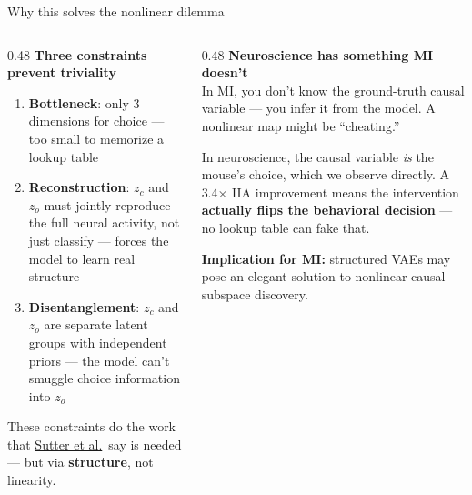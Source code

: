 \documentclass[aspectratio=169,11pt]{beamer}
\begin{document}
\begin{frame}{Why this solves the nonlinear dilemma}
\begin{columns}[T]
\begin{column}{0.48\textwidth}
\textbf{Three constraints prevent triviality}
\begin{enumerate}\setlength\itemsep{4pt}
  \item \textbf{Bottleneck}: only 3 dimensions for choice --- too small to memorize a lookup table
  \item \textbf{Reconstruction}: $z_c$ and $z_o$ must jointly reproduce the full neural activity, not just classify --- forces the model to learn real structure
  \item \textbf{Disentanglement}: $z_c$ and $z_o$ are separate latent groups with independent priors --- the model can't smuggle choice information into $z_o$
\end{enumerate}

\vspace{0.3em}
{\small These constraints do the work that \href{https://arxiv.org/abs/2501.02043}{Sutter et al.}\ say is needed --- but via \textbf{structure}, not linearity.}
\end{column}
\begin{column}{0.48\textwidth}
\textbf{Neuroscience has something MI doesn't}\\[0.3em]
{\small In MI, you don't know the ground-truth causal variable --- you infer it from the model. A nonlinear map might be ``cheating.''}

\vspace{0.3em}
{\small In neuroscience, the causal variable \emph{is} the mouse's choice, which we observe directly. A 3.4$\times$ IIA improvement means the intervention \textbf{actually flips the behavioral decision} --- no lookup table can fake that.}

\vspace{0.3em}
{\small \textbf{Implication for MI:} structured VAEs may pose an elegant solution to nonlinear causal subspace discovery.}
\end{column}
\end{columns}
\end{frame}
\end{document}
